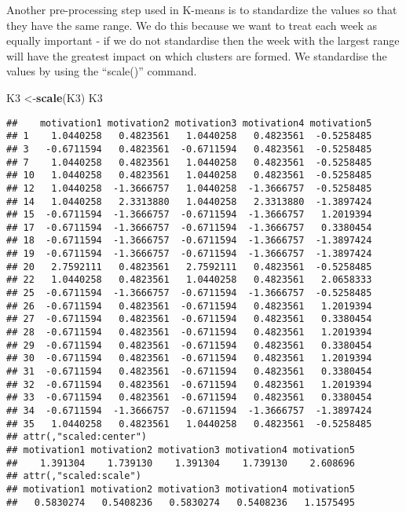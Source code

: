\documentclass[]{article}
\newenvironment{Shaded}{\begin{snugshade}}{\end{snugshade}}
\newcommand{\KeywordTok}[1]{\textcolor[rgb]{0.13,0.29,0.53}{\textbf{#1}}}
\newcommand{\NormalTok}[1]{#1}
\begin{document}
Another pre-processing step used in K-means is to standardize the values
so that they have the same range. We do this because we want to treat
each week as equally important - if we do not standardise then the week
with the largest range will have the greatest impact on which clusters
are formed. We standardise the values by using the ``scale()'' command.

\begin{Shaded}
\begin{Highlighting}[]
\NormalTok{K3 <-}\KeywordTok{scale}\NormalTok{(K3)}
\NormalTok{K3}
\end{Highlighting}
\end{Shaded}

\begin{verbatim}
##    motivation1 motivation2 motivation3 motivation4 motivation5
## 1    1.0440258   0.4823561   1.0440258   0.4823561  -0.5258485
## 3   -0.6711594   0.4823561  -0.6711594   0.4823561  -0.5258485
## 7    1.0440258   0.4823561   1.0440258   0.4823561  -0.5258485
## 10   1.0440258   0.4823561   1.0440258   0.4823561  -0.5258485
## 12   1.0440258  -1.3666757   1.0440258  -1.3666757  -0.5258485
## 14   1.0440258   2.3313880   1.0440258   2.3313880  -1.3897424
## 15  -0.6711594  -1.3666757  -0.6711594  -1.3666757   1.2019394
## 17  -0.6711594  -1.3666757  -0.6711594  -1.3666757   0.3380454
## 18  -0.6711594  -1.3666757  -0.6711594  -1.3666757  -1.3897424
## 19  -0.6711594  -1.3666757  -0.6711594  -1.3666757  -1.3897424
## 20   2.7592111   0.4823561   2.7592111   0.4823561  -0.5258485
## 22   1.0440258   0.4823561   1.0440258   0.4823561   2.0658333
## 25  -0.6711594  -1.3666757  -0.6711594  -1.3666757  -0.5258485
## 26  -0.6711594   0.4823561  -0.6711594   0.4823561   1.2019394
## 27  -0.6711594   0.4823561  -0.6711594   0.4823561   0.3380454
## 28  -0.6711594   0.4823561  -0.6711594   0.4823561   1.2019394
## 29  -0.6711594   0.4823561  -0.6711594   0.4823561   0.3380454
## 30  -0.6711594   0.4823561  -0.6711594   0.4823561   1.2019394
## 31  -0.6711594   0.4823561  -0.6711594   0.4823561   0.3380454
## 32  -0.6711594   0.4823561  -0.6711594   0.4823561   1.2019394
## 33  -0.6711594   0.4823561  -0.6711594   0.4823561   0.3380454
## 34  -0.6711594  -1.3666757  -0.6711594  -1.3666757  -1.3897424
## 35   1.0440258   0.4823561   1.0440258   0.4823561  -0.5258485
## attr(,"scaled:center")
## motivation1 motivation2 motivation3 motivation4 motivation5 
##    1.391304    1.739130    1.391304    1.739130    2.608696 
## attr(,"scaled:scale")
## motivation1 motivation2 motivation3 motivation4 motivation5 
##   0.5830274   0.5408236   0.5830274   0.5408236   1.1575495
\end{verbatim}
\end{document}
